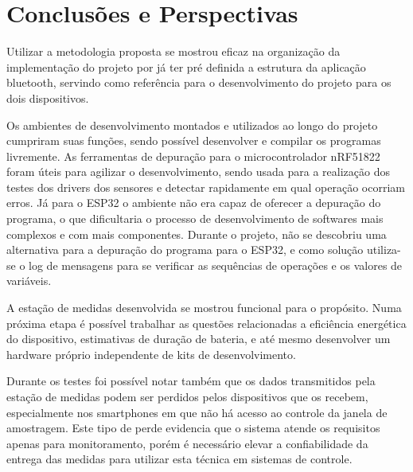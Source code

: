 \section{Conclusões e Perspectivas}

Utilizar a metodologia proposta se mostrou eficaz na organização da
implementação do projeto por já ter pré definida a estrutura da aplicação
bluetooth, servindo como referência para o desenvolvimento do projeto para os
dois dispositivos. 

Os ambientes de desenvolvimento montados e utilizados ao longo do projeto
cumpriram suas funções, sendo possível desenvolver e compilar os programas
livremente. As ferramentas de depuração para o microcontrolador nRF51822 foram
úteis para agilizar o desenvolvimento, sendo usada para a realização dos
testes dos drivers dos sensores e detectar rapidamente em qual operação ocorriam
erros. Já para o ESP32 o ambiente não era capaz de oferecer a depuração do
programa, o que dificultaria o processo de desenvolvimento de softwares mais
complexos e com mais componentes. Durante o projeto, não se descobriu uma
alternativa para a depuração do programa para o ESP32, e como solução utiliza-se
o log de mensagens para se verificar as sequências de operações e os valores de
variáveis. 

A estação de medidas desenvolvida se mostrou funcional para o propósito. Numa
próxima etapa é possível trabalhar as questões relacionadas a eficiência
energética do dispositivo, estimativas de duração de bateria, e até mesmo
desenvolver um hardware próprio independente de kits de desenvolvimento.

Durante os testes foi possível notar também que os dados transmitidos pela
estação de medidas podem ser perdidos pelos dispositivos que os recebem,
especialmente nos smartphones em que não há acesso ao controle da janela de
amostragem. Este tipo de perde evidencia que o sistema atende os requisitos
apenas para monitoramento, porém é necessário elevar a confiabilidade da entrega
das medidas para utilizar esta técnica em sistemas de controle.





